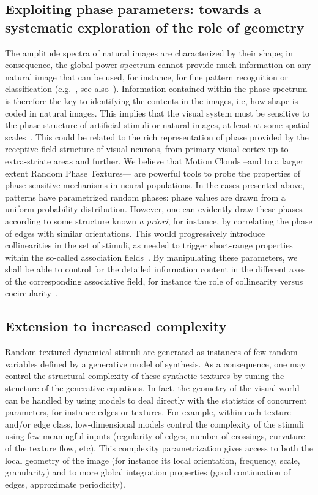 \documentclass[a4paper,11pt]{article}%
\begin{document}
\subsection{Exploiting phase parameters: towards a systematic exploration of the role of geometry }
The amplitude spectra of natural images are characterized by their  shape; in consequence, the global power spectrum cannot provide much information on any natural image that can be used, for instance, for fine pattern recognition or classification  (e.g.~\citep{VictorComte1996}, see also~\citep{Oliva01,Torralba03}). Information contained within the phase spectrum is therefore the key to {identifying} the contents in the images, i.e, how shape is coded in natural images. This implies that the visual system must be sensitive to the phase structure of artificial stimuli or natural images, at least at some spatial scales~\citep{PhillipsTodd2010,HansenHess2006}. This could be related to the rich representation of phase provided by the receptive field structure of visual neurons, from primary visual cortex up to extra-striate areas and further. We believe that Motion Clouds --and to a larger extent Random Phase Textures--- are powerful tools to probe the properties of phase-sensitive mechanisms in neural populations. In the cases presented above, patterns have parametrized random phases: phase values are drawn from a uniform probability distribution. However, one can evidently draw these phases according to some structure known \textit{a priori}, for instance, by correlating the phase of edges with similar orientations. This would progressively introduce collinearities in the set of stimuli, as needed to trigger short-range properties within the so-called association fields~\citep{hessreview03}. By manipulating these parameters, we shall be able to control for the detailed information content in the different axes of the corresponding associative field, for instance the role of collinearity versus cocircularity~\citep{Perrinet11sfn}. %
%
\subsection{Extension to increased complexity}
Random textured dynamical stimuli are generated as instances of few random variables defined by a generative model of synthesis. As a consequence, one may control the structural complexity of these synthetic textures by tuning the structure of the generative equations. In fact, the geometry of the visual world can be handled by using models to deal directly with the statistics of concurrent parameters, for instance edges or textures. For  example, within each texture and/or edge class, low-dimensional models control the complexity of the stimuli using few meaningful inputs (regularity of edges, number of crossings, curvature of the texture flow, etc). This complexity parametrization gives access to both the local geometry of the image (for instance its local orientation, frequency, scale, granularity) and to more global integration properties (good continuation of edges, approximate periodicity). %
\end{document}
